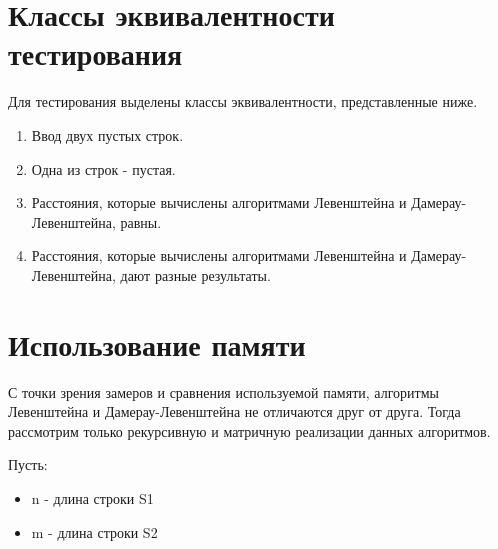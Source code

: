 
\clearpage

\section{Классы эквивалентности тестирования}

Для тестирования выделены классы эквивалентности, представленные ниже.

\begin{enumerate}
    \item Ввод двух пустых строк.
    \item Одна из строк - пустая.
    \item Расстояния, которые вычислены алгоритмами Левенштейна и Дамерау-Левенштейна, равны.
    \item Расстояния, которые вычислены алгоритмами Левенштейна и Дамерау-Левенштейна, дают разные результаты.
\end{enumerate}

\section{Использование памяти}

С точки зрения замеров и сравнения используемой памяти, алгоритмы Левенштейна и Дамерау-Левенштейна не отличаются друг от друга.
Тогда рассмотрим только рекурсивную и матричную реализации данных алгоритмов.

Пусть:
\begin{itemize}
    \item n - длина строки S1
    \item m - длина строки S2
\end{itemize}

